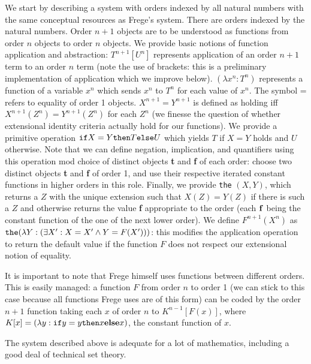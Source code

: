 \documentclass{article}
\begin{document}
{{We start by describing a system with orders indexed by all natural numbers with the same conceptual resources as Frege's system.  There are orders indexed by the natural numbers.
Order $n+1$ objects are to be understood as functions from order $n$ objects to order $n$ objects.  We provide basic notions of function application and abstraction:  $T^{n+1}[U^n]$ represents application of an order $n+1$ term to an order $n$ term (note the use of brackets:  this is a preliminary implementation of application which we improve below).  $(\lambda x^n:T^{n})$ represents a function of a variable $x^n$ which sends $x^n$ to $T^n$ for each value of $x^n$.  The symbol = refers to equality of order 1 objects.  $X^{n+1}=Y^{n+1}$ is defined as holding iff $X^{n+1}(Z^n)=Y^{n+1}(Z^n)$ for each $Z^n$ (we finesse the question of whether extensional identity criteria actually hold for our functions).  We provide a primitive operation ${\tt if} X = Y {\tt then} T {\tt else} U$ which yields $T$ if
$X=Y$ holds and $U$ otherwise.  Note that we can define negation, implication, and quantifiers using this operation mod choice of distinct objects {\bf t} and {\bf f} of each order:  choose two distinct objects {\bf t} and {\bf f} of order 1, and use their respective iterated constant functions in higher orders in this role.   Finally, we provide {\tt the} $(X,Y)$, which returns a $Z$ with the unique extension such that $X(Z)=Y(Z)$ if there is such a $Z$ and otherwise returns the value {\bf f} appropriate to the order (each ${\bf f}$ being the constant function of the one of the next lower order).  We define $F^{n+1}(X^n)$ as ${\tt the}(\lambda Y:(\exists X':X=X' \wedge Y=F(X')))$:  this modifies the application operation to return the default value if the function $F$ does not respect our extensional notion of equality.

It is important to note that Frege himself uses functions between different orders.  This is easily managed:  a function $F$ from order $n$ to order 1 (we can stick to this case because all functions Frege uses are of this form) can be coded by the order $n+1$ function taking each $x$ of order $n$ to $K^{n-1}[F(x)]$, where $K[x] = (\lambda y:{\tt if} y=y{\tt then}x{\bf else} x)$, the constant function of $x$.

The system described above is adequate for a lot of mathematics, including a good deal of technical set theory.

}}
\end{document}
